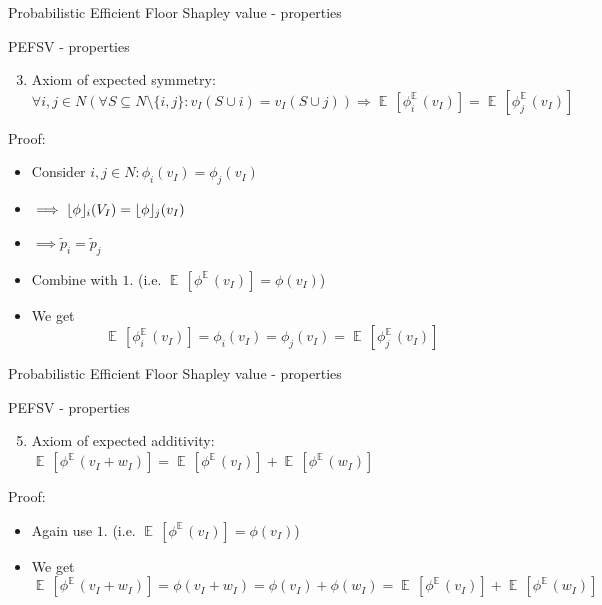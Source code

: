 \documentclass{beamer}
\newcommand{\floor}[1]{\left\lfloor #1 \right\rfloor}
\newcommand{\floorphi}{\ensuremath{\floor{\phi}\hspace{-0.5ex}}}
\DeclareMathOperator{\E}{\mathbb{E}\,}
\begin{document}
\begin{frame}{Probabilistic Efficient Floor Shapley value - properties}
    \pause
    \begin{block}{PEFSV - properties}
        \begin{enumerate}
            \setcounter{enumi}{2}
            \item Axiom of expected symmetry: $\forall i,j \in N (\forall S \subseteq N \setminus \{i,j\}: v_I(S \cup i) = v_I(S \cup j)) \Rightarrow \E[\phi_{i}^{\E}(v_I)] = \E[\phi_{j}^{\E}(v_I)]$
        \end{enumerate}
    \end{block}

    \pause
    Proof:

    \begin{itemize}
        \pause
        \item Consider $i,j \in N: \phi_i(v_I) = \phi_j(v_I)$
        \pause
        \item $\implies \floorphi_i(V_I) = \floorphi_j(v_I)$
        \pause
        \item $\implies \tilde{p}_i = \tilde{p}_j$
        \pause
        \item Combine with $1.$ (i.e. $\E[\phi^{\E}(v_I)] = \phi(v_I)$)
        \pause
        \item We get
        \begin{displaymath}
            \E[\phi_{i}^{\E}(v_I)] = \phi_i(v_I) = \phi_j(v_I) = \E[\phi_{j}^{\E}(v_I)]
        \end{displaymath}
    \end{itemize}
\end{frame}



\begin{frame}{Probabilistic Efficient Floor Shapley value - properties}
    \pause
    \begin{block}{PEFSV - properties}
        \begin{enumerate}
            \setcounter{enumi}{4}
            \item Axiom of expected additivity: $\E[\phi^{\E}(v_I+w_I)] = \E[\phi^{\E}(v_I)] + \E[\phi^{\E}(w_I)]$
        \end{enumerate}
    \end{block}

    \pause

    Proof:

    \begin{itemize}
        \pause
        \item Again use $1.$ (i.e. $\E[\phi^{\E}(v_I)] = \phi(v_I)$)
        \pause
        \item We get
        \begin{displaymath}
            \E[\phi^{\E}(v_I+w_I)] = \phi(v_I+w_I) = \phi(v_I) + \phi(w_I) = \E[\phi^{\E}(v_I)] + \E[\phi^{\E}(w_I)]
        \end{displaymath}
    \end{itemize}

\end{frame}
\end{document}
